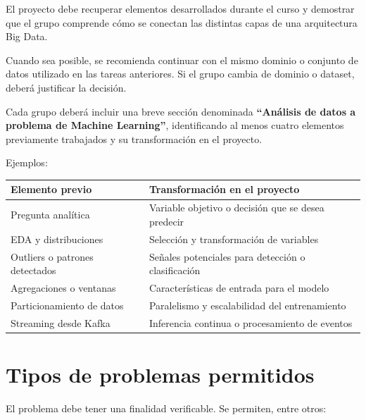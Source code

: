 \documentclass[11pt,a4paper]{article}
\begin{document}
El proyecto debe recuperar elementos desarrollados durante el curso y demostrar que el
grupo comprende cómo se conectan las distintas capas de una arquitectura Big Data.

Cuando sea posible, se recomienda continuar con el mismo dominio o conjunto de datos
utilizado en las tareas anteriores. Si el grupo cambia de dominio o dataset, deberá
justificar la decisión.

Cada grupo deberá incluir una breve sección denominada \textbf{``Análisis de datos a
problema de Machine Learning''}, identificando al menos cuatro elementos previamente
trabajados y su transformación en el proyecto.

Ejemplos:

\vspace{0.25em}
\noindent
\small
\renewcommand{\arraystretch}{1.05}
\begin{tabularx}{\textwidth}{@{}>{\raggedright\arraybackslash}p{}
                                   >{\raggedright\arraybackslash}X@{}}
  \toprule
  \textbf{Elemento previo} & \textbf{Transformación en el proyecto} \\
  \midrule
  Pregunta analítica & Variable objetivo o decisión que se desea predecir \\
  EDA y distribuciones & Selección y transformación de variables \\
  Outliers o patrones detectados & Señales potenciales para detección o clasificación \\
  Agregaciones o ventanas & Características de entrada para el modelo \\
  Particionamiento de datos & Paralelismo y escalabilidad del entrenamiento \\
  Streaming desde Kafka & Inferencia continua o procesamiento de eventos \\
  \bottomrule
\end{tabularx}
\vspace{0.2em}

\section{Tipos de problemas permitidos}

El problema debe tener una finalidad verificable. Se permiten, entre otros:
\end{document}
